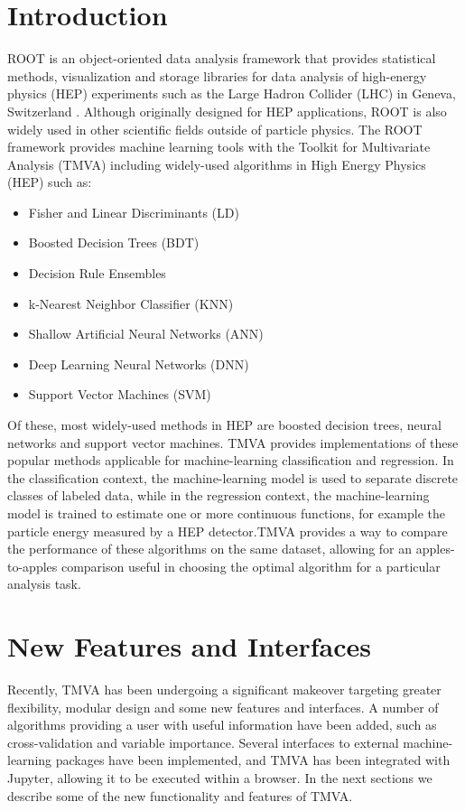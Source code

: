\documentclass[a4paper]{jpconf}
\begin{document}
\section{Introduction}
ROOT is an object-oriented data analysis framework that provides statistical methods, visualization and storage libraries for data analysis of high-energy physics (HEP) experiments such as the Large Hadron Collider (LHC) in Geneva, Switzerland \cite{Antcheva20092499}. Although originally designed for HEP applications, ROOT is also widely used in other scientific fields outside of particle physics.\newline\newline 
The ROOT framework provides machine learning tools with the Toolkit for Multivariate Analysis (TMVA) \cite{Hocker:2007ht} including widely-used algorithms in High Energy Physics (HEP) such as:
\begin{itemize}  
\item Fisher and Linear Discriminants (LD)
\item Boosted Decision Trees (BDT)
\item Decision Rule Ensembles
\item k-Nearest Neighbor Classifier (KNN)
\item Shallow Artificial Neural Networks (ANN)
\item Deep Learning Neural Networks (DNN)
\item Support Vector Machines (SVM)
\end{itemize}
Of these, most widely-used methods in HEP are boosted decision trees, neural networks and support vector machines. TMVA provides implementations of these popular methods applicable for machine-learning classification and regression. In the classification context, the machine-learning model is used to separate discrete classes of labeled data, while in the regression context, the machine-learning model is trained to estimate one or more continuous functions, for example the particle energy measured by a HEP detector.TMVA provides a way to compare the performance of these algorithms on the same dataset, allowing for an apples-to-apples comparison useful in choosing the optimal algorithm for a particular analysis task.

\section{New Features and Interfaces}
Recently, TMVA has  been undergoing a significant makeover targeting greater flexibility, modular design and some new features and interfaces. A number of algorithms providing a user with useful information have been added, such as cross-validation and variable importance. Several interfaces to external machine-learning packages have been implemented, and TMVA has been integrated with Jupyter, allowing it to be executed within a browser. In the next sections we describe some of the new functionality and features of TMVA.
\end{document}
